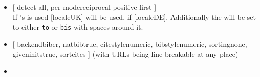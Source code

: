 \begin{multicols}{2}
\begin{itemize}[leftmargin=10pt]
      \begin{itemize}
        \item {}
          [%
            detect-all,
            per-mode\Seq reciprocal-positive-first%
          ]\\
          If 's  is used [locale\Seq UK] will be used,
          if  [locale\Seq DE]. Additionally the 
          will be set to either \texttt{to} or \texttt{bis} with spaces around
          it.
        \item {}
          [%
            backend\Seq biber, natbib\Seq true, citestyle\Seq numeric,
            bibstyle\Seq numeric, sorting\Seq none, giveninits\Seq true,
            sortcites%
          ] (with URLs being line breakable at any place)
        \item {}
      \end{itemize}
  \end{itemize}
\end{multicols}%
